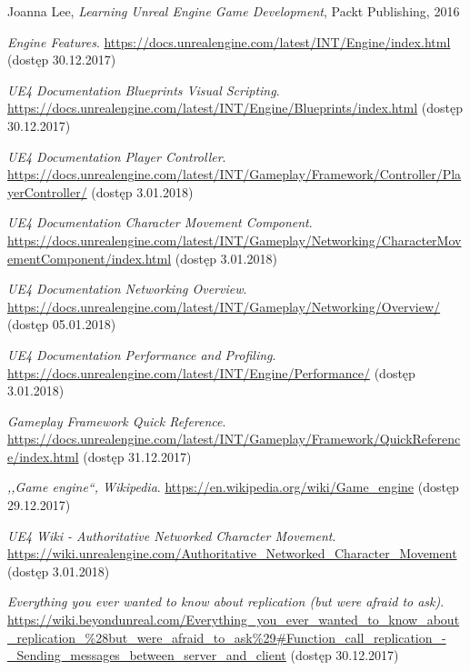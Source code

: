 \documentclass[multip]{SGGW-thesis}
\begin{document}
\begin{thebibliography}{9}

Joanna Lee, \textit{Learning Unreal Engine Game Development}, Packt Publishing, 2016

\textit{Engine Features}. \url{https://docs.unrealengine.com/latest/INT/Engine/index.html} (dostęp 30.12.2017)

\textit{UE4 Documentation Blueprints Visual Scripting}. \url{https://docs.unrealengine.com/latest/INT/Engine/Blueprints/index.html} (dostęp 30.12.2017)

\textit{UE4 Documentation Player Controller}. \url{https://docs.unrealengine.com/latest/INT/Gameplay/Framework/Controller/PlayerController/}  (dostęp 3.01.2018)

\textit{UE4 Documentation Character Movement Component}.  \url{https://docs.unrealengine.com/latest/INT/Gameplay/Networking/CharacterMovementComponent/index.html}  (dostęp 3.01.2018)

\textit{UE4 Documentation Networking Overview}. \url{https://docs.unrealengine.com/latest/INT/Gameplay/Networking/Overview/} (dostęp 05.01.2018)

\textit{UE4 Documentation Performance and Profiling}. \url{https://docs.unrealengine.com/latest/INT/Engine/Performance/}  (dostęp 3.01.2018)

\textit{Gameplay Framework Quick Reference}. \url{https://docs.unrealengine.com/latest/INT/Gameplay/Framework/QuickReference/index.html} (dostęp 31.12.2017)

\textit{,,Game engine``, Wikipedia}. \url{https://en.wikipedia.org/wiki/Game_engine} {\mbox(dostęp 29.12.2017)}

\textit{UE4 Wiki - Authoritative Networked Character Movement}. \url{https://wiki.unrealengine.com/Authoritative_Networked_Character_Movement}  (dostęp 3.01.2018)

\textit{Everything you ever wanted to know about replication (but were afraid to ask)}. \url{https://wiki.beyondunreal.com/Everything_you_ever_wanted_to_know_about_replication_\%28but_were_afraid_to_ask\%29#Function_call_replication_-_Sending_messages_between_server_and_client} (dostęp 30.12.2017)


\end{thebibliography}
\end{document}

